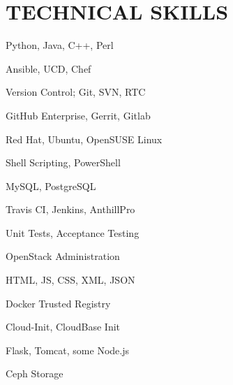 \documentclass[]{dylan-resume}
\begin{document}
\begin{minipage}[t]{1.00\textwidth}
\section{TECHNICAL SKILLS}
\begin{center}
\begin{minipage}[b]{0.33333\textwidth}
\raggedright
Python, Java, C++, Perl \par
Ansible, UCD, Chef \par
Version Control; Git, SVN, RTC \par
GitHub Enterprise, Gerrit, Gitlab \par
Red Hat, Ubuntu, OpenSUSE Linux \par
\end{minipage}%
\begin{minipage}[b]{0.33333\textwidth}
\centering
Shell Scripting, PowerShell \par
MySQL, PostgreSQL \par
Travis CI, Jenkins, AnthillPro \par
Unit Tests, Acceptance Testing \par
OpenStack Administration
\end{minipage}%
\begin{minipage}[b]{0.33333\textwidth}
\raggedleft
HTML, JS, CSS, XML, JSON \par
Docker Trusted Registry \par
Cloud-Init, CloudBase Init \par
Flask, Tomcat, some Node.js \par
Ceph Storage
\end{minipage}
\end{center}


\end{minipage}
\end{document}
